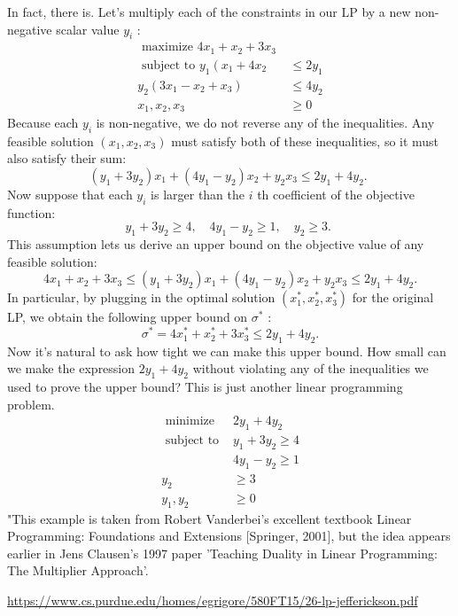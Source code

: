 In fact, there is. Let's multiply each of the constraints in our LP by a new non-negative scalar value $y_{i}$ :
$$
\begin{aligned}
\text { maximize } 4 x_{1}+x_{2}+3 x_{3} & \\
\text { subject to } y_{1}\left(x_{1}+4 x_{2} \quad\right.& \leq 2 y_{1} \\
y_{2}\left(3 x_{1}-x_{2}+x_{3}\right) & \leq 4 y_{2} \\
x_{1}, x_{2}, x_{3} & \geq 0
\end{aligned}
$$
Because each $y_{i}$ is non-negative, we do not reverse any of the inequalities. Any feasible solution $\left(x_{1}, x_{2}, x_{3}\right)$ must satisfy both of these inequalities, so it must also satisfy their sum:
$$
\left(y_{1}+3 y_{2}\right) x_{1}+\left(4 y_{1}-y_{2}\right) x_{2}+y_{2} x_{3} \leq 2 y_{1}+4 y_{2} \text {. }
$$
Now suppose that each $y_{i}$ is larger than the $i$ th coefficient of the objective function:
$$
y_{1}+3 y_{2} \geq 4, \quad 4 y_{1}-y_{2} \geq 1, \quad y_{2} \geq 3 \text {. }
$$
This assumption lets us derive an upper bound on the objective value of any feasible solution:
$$
4 x_{1}+x_{2}+3 x_{3} \leq\left(y_{1}+3 y_{2}\right) x_{1}+\left(4 y_{1}-y_{2}\right) x_{2}+y_{2} x_{3} \leq 2 y_{1}+4 y_{2} .
$$
In particular, by plugging in the optimal solution $\left(x_{1}^{*}, x_{2}^{*}, x_{3}^{*}\right)$ for the original LP, we obtain the following upper bound on $\sigma^{*}$ :
$$
\sigma^{*}=4 x_{1}^{*}+x_{2}^{*}+3 x_{3}^{*} \leq 2 y_{1}+4 y_{2} .
$$
Now it's natural to ask how tight we can make this upper bound. How small can we make the expression $2 y_{1}+4 y_{2}$ without violating any of the inequalities we used to prove the upper bound? This is just another linear programming problem.
$$
\begin{array}{rr}
\text { minimize } & 2 y_{1}+4 y_{2} \\
\text { subject to } & y_{1}+3 y_{2} \geq 4 \\
& 4 y_{1}-y_{2} \geq 1 \\
y_{2} & \geq 3 \\
y_{1}, y_{2} & \geq 0
\end{array}
$$
"This example is taken from Robert Vanderbei's excellent textbook Linear Programming: Foundations and Extensions [Springer, 2001], but the idea appears earlier in Jens Clausen's 1997 paper 'Teaching Duality in Linear Programming: The Multiplier Approach'.

\url{https://www.cs.purdue.edu/homes/egrigore/580FT15/26-lp-jefferickson.pdf}
